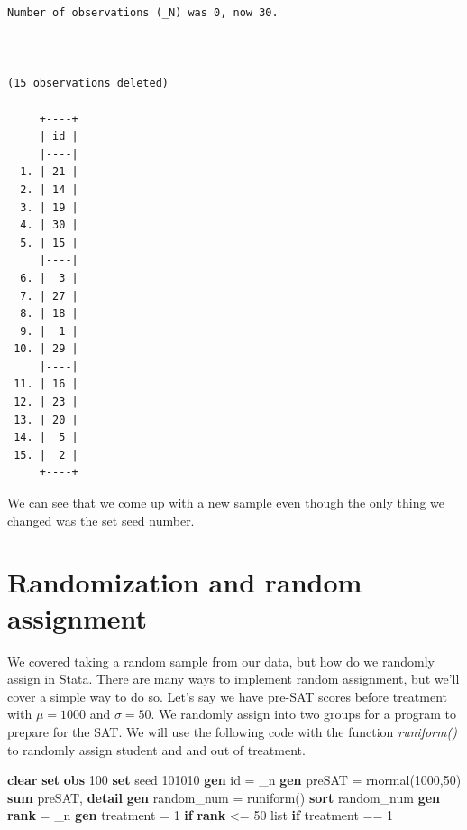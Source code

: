 \documentclass[
]{book}
\newenvironment{Shaded}{\begin{snugshade}}{\end{snugshade}}
\newcommand{\DataTypeTok}[1]{\textcolor[rgb]{0.13,0.29,0.53}{#1}}
\newcommand{\DecValTok}[1]{\textcolor[rgb]{0.00,0.00,0.81}{#1}}
\newcommand{\FunctionTok}[1]{\textcolor[rgb]{0.13,0.29,0.53}{\textbf{#1}}}
\newcommand{\KeywordTok}[1]{\textcolor[rgb]{0.13,0.29,0.53}{\textbf{#1}}}
\newcommand{\NormalTok}[1]{#1}
\newcommand{\OtherTok}[1]{\textcolor[rgb]{0.56,0.35,0.01}{#1}}
\begin{document}
\begin{verbatim}
Number of observations (_N) was 0, now 30.



(15 observations deleted)

     +----+
     | id |
     |----|
  1. | 21 |
  2. | 14 |
  3. | 19 |
  4. | 30 |
  5. | 15 |
     |----|
  6. |  3 |
  7. | 27 |
  8. | 18 |
  9. |  1 |
 10. | 29 |
     |----|
 11. | 16 |
 12. | 23 |
 13. | 20 |
 14. |  5 |
 15. |  2 |
     +----+
\end{verbatim}

We can see that we come up with a new sample even though the only thing we changed was the set seed number.

\section{Randomization and random assignment}\label{randomization-and-random-assignment}

We covered taking a random sample from our data, but how do we randomly assign in Stata. There are many ways to implement random assignment, but we'll cover a simple way to do so. Let's say we have pre-SAT scores before treatment with \(\mu=1000\) and \(\sigma=50\). We randomly assign into two groups for a program to prepare for the SAT. We will use the following code with the function \emph{runiform()} to randomly assign student and and out of treatment.

\begin{Shaded}
\begin{Highlighting}[]
\KeywordTok{clear}
\KeywordTok{set} \KeywordTok{obs}\NormalTok{ 100}
\KeywordTok{set} \DecValTok{seed}\NormalTok{ 101010}
\KeywordTok{gen}\NormalTok{ id = }\DataTypeTok{\_n}
\KeywordTok{gen}\NormalTok{ preSAT = rnormal(1000,50)}
\KeywordTok{sum}\NormalTok{ preSAT, }\KeywordTok{detail}
\KeywordTok{gen}\NormalTok{ random\_num = runiform()}
\KeywordTok{sort}\NormalTok{ random\_num}
\KeywordTok{gen} \FunctionTok{rank}\NormalTok{ = }\DataTypeTok{\_n}
\KeywordTok{gen}\NormalTok{ treatment = 1 }\KeywordTok{if} \FunctionTok{rank}\NormalTok{ \textless{}= 50}
\OtherTok{list} \KeywordTok{if}\NormalTok{ treatment == 1}
\end{Highlighting}
\end{Shaded}
\end{document}
